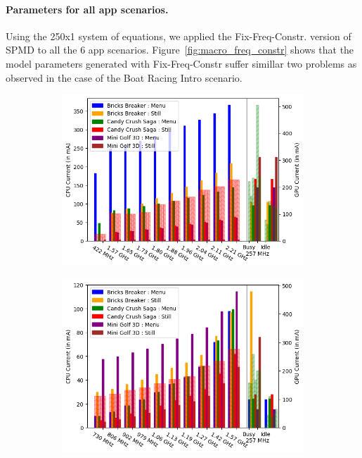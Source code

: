 \paragraph{Parameters for all app scenarios.}
Using the 250x1 system of equations, we applied the Fix-Freq-Constr. version of SPMD 
to all the 6 app scenarios. Figure~\ref{fig:macro_freq_constr} shows that the model parameters generated with Fix-Freq-Constr 
suffer simillar two problems as observed in the case of the Boat Racing Intro scenario.

\begin{figure}[tp]
    \centering
     \begin{subfigure}[b]{0.32\textwidth}
         \centering
         \includegraphics[width=\textwidth]{figures/002_Pixel2_250_5_macro_equations.png}
         \label{fig:number_parameters_vs_duration_100s_0}
     \end{subfigure}
    \begin{subfigure}[b]{0.32\textwidth}
         \centering
         \includegraphics[width=\textwidth]{figures/003_MotoZ3_250_5_macro_equations.png}

\end{subfigure}
\end{figure}
